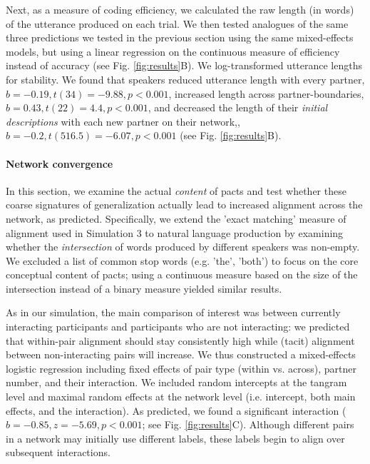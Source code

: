 Next, as a measure of coding efficiency, we calculated the raw length (in words) of the utterance produced on each trial.
We then tested analogues of the same three predictions we tested in the previous section using the same mixed-effects models, but using a linear regression on the continuous measure of efficiency instead of accuracy (see Fig. \ref{fig:results}B).
We log-transformed utterance lengths for stability.
We found that speakers reduced utterance length with every partner, $b = -0.19, t(34) = -9.88, p < 0.001$, increased length across partner-boundaries, $b = 0.43, t(22) = 4.4, p < 0.001$, and decreased the length of their \emph{initial descriptions} with each new partner on their network,, $b = -0.2, t(516.5) = -6.07, p < 0.001$ (see Fig. \ref{fig:results}B).

\paragraph{Network convergence }

In this section, we examine the actual \emph{content} of pacts and test whether these coarse signatures of generalization actually lead to increased alignment across the network, as predicted. 
Specifically, we extend the 'exact matching' measure of alignment used in Simulation 3 to natural language production by examining whether the \emph{intersection} of words produced by different speakers was non-empty.
We excluded a list of common stop words (e.g. 'the', 'both') to focus on the core conceptual content of pacts; using a continuous measure based on the size of the intersection instead of a binary measure yielded similar results.

As in our simulation, the main comparison of interest was between currently interacting participants and participants who are not interacting: we predicted that within-pair alignment should stay consistently high while (tacit) alignment between non-interacting pairs will increase. 
We thus constructed a mixed-effects logistic regression including fixed effects of pair type (within vs. across), partner number, and their interaction.
We included random intercepts at the tangram level and maximal random effects at the network level (i.e. intercept, both main effects, and the interaction).
As predicted, we found a significant interaction ($b = -0.85, z = -5.69, p < 0.001$; see Fig. \ref{fig:results}C).
Although different pairs in a network may initially use different labels, these labels begin to align over subsequent interactions. 

